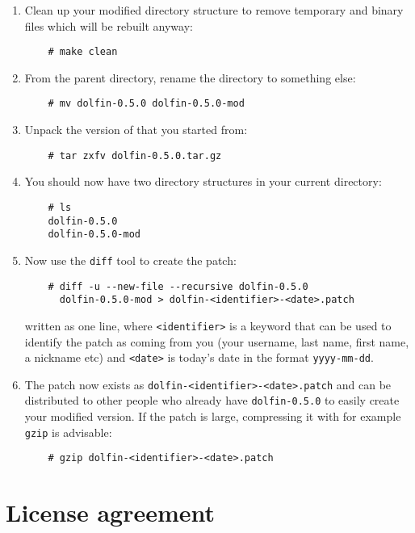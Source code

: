 \begin{enumerate}
\item
  Clean up your modified directory structure to remove temporary and binary
  files which will be rebuilt anyway:
  \begin{verbatim}
    # make clean
  \end{verbatim}
\item
  From the parent directory, rename the \dolfin{} directory to something else:
  \begin{verbatim}
    # mv dolfin-0.5.0 dolfin-0.5.0-mod
  \end{verbatim}
\item
  Unpack the version of \dolfin{} that you started from:
  \begin{verbatim}
    # tar zxfv dolfin-0.5.0.tar.gz
  \end{verbatim}
\item
  You should now have two \dolfin{} directory structures in your current directory:
  \begin{verbatim}
    # ls
    dolfin-0.5.0
    dolfin-0.5.0-mod
  \end{verbatim}
\item
  Now use the \texttt{diff} tool to create the patch:
  \begin{verbatim}
    # diff -u --new-file --recursive dolfin-0.5.0
      dolfin-0.5.0-mod > dolfin-<identifier>-<date>.patch
  \end{verbatim}
  written as one line, where \texttt{<identifier>} is a keyword that
  can be used to identify the patch as coming from you (your username,
  last name, first name, a nickname etc) and \texttt{<date>} is
  today's date in the format \texttt{yyyy-mm-dd}.
\item
  The patch now exists as \texttt{dolfin-<identifier>-<date>.patch}
  and can be distributed to other people who already have
  \texttt{dolfin-0.5.0} to easily create your modified version. If the
  patch is large, compressing it with for example \texttt{gzip} is
  advisable:
  \begin{verbatim}
    # gzip dolfin-<identifier>-<date>.patch
  \end{verbatim}
\end{enumerate}

\section{License agreement}

